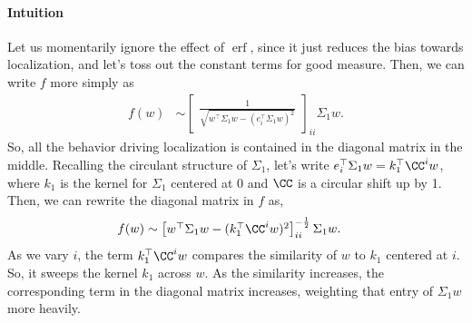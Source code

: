 \documentclass{article}
\begin{document}
\paragraph*{Intuition}
Let us momentarily ignore the effect of $\operatorname{erf}$, since it just reduces the bias towards localization, and let's toss out the constant terms for good measure.
Then, we can write $f$ more simply as
\begin{align*}
  f(w) &\sim \begin{bmatrix} \frac{ 1 }{ \sqrt{ w^\top \Sigma_1 w - ( e_i^\top \Sigma_1 w )^2 } } \end{bmatrix}_{ii} \Sigma_1 w.
\end{align*}
So, all the behavior driving localization is contained in the diagonal matrix in the middle.
Recalling the circulant structure of $\Sigma_1$, let's write $e_i^\top \Sigma_1 w = k_1^\top \CC^i w$, where $k_1$ is the kernel for $\Sigma_1$ centered at 0 and $\CC$ is a circular shift up by 1.
Then, we can rewrite the diagonal matrix in $f$ as,
\begin{align*}
  f(w) &\sim \begin{bmatrix} w^\top \Sigma_1 w - ( k_1^\top \CC^i w )^2 \end{bmatrix}_{ii}^{-\frac{1}{2}} \Sigma_1 w.
\end{align*}
As we vary $i$, the term $k_1^\top \CC^i w$ compares the similarity of $w$ to $k_1$ centered at $i$.
So, it sweeps the kernel $k_1$ across $w$.
As the similarity increases, the corresponding term in the diagonal matrix increases, weighting that entry of $\Sigma_1 w$ more heavily.
\end{document}
